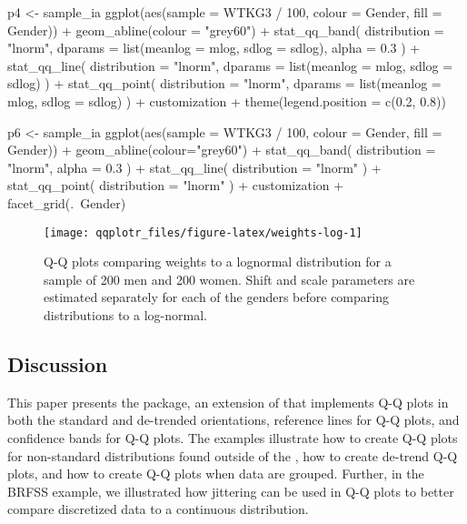 \begin{Schunk}
\begin{Sinput}
p4 <- sample_ia %>% 
  ggplot(aes(sample = WTKG3 / 100, colour = Gender, fill = Gender)) +
  geom_abline(colour = "grey60") +
  stat_qq_band(
    distribution = "lnorm",
    dparams = list(meanlog = mlog, sdlog = sdlog),
    alpha = 0.3
  ) +
  stat_qq_line(
    distribution = "lnorm",
    dparams = list(meanlog = mlog, sdlog = sdlog)
  ) +
  stat_qq_point(
    distribution = "lnorm",
    dparams = list(meanlog = mlog, sdlog = sdlog)
  ) +
  customization +
  theme(legend.position = c(0.2, 0.8)) 

p6 <- sample_ia %>% 
  ggplot(aes(sample = WTKG3 / 100, colour = Gender, fill = Gender)) +
  geom_abline(colour="grey60") +
  stat_qq_band(
    distribution = "lnorm", 
    alpha = 0.3
  ) +
  stat_qq_line(
    distribution = "lnorm"
  ) +
  stat_qq_point(
    distribution = "lnorm"
  ) +
  customization + facet_grid(.~Gender)
\end{Sinput}
\begin{figure}

{\centering \texttt{[image: qqplotr\_files/figure-latex/weights-log-1]} 

}

\caption[Q-Q plots comparing weights to a lognormal distribution for a sample of 200 men and 200 women]{Q-Q plots comparing weights to a lognormal distribution for a sample of 200 men and 200 women. Shift and scale parameters are estimated separately for each of the genders before comparing distributions to a log-normal.}\label{fig:weights-log}
\end{figure}
\end{Schunk}

\subsection{Discussion}\label{discussion}

This paper presents the  package, an extension of
 that implements Q-Q plots in both the standard and
de-trended orientations, reference lines for Q-Q plots, and confidence
bands for Q-Q plots. The examples illustrate how to create Q-Q plots for
non-standard distributions found outside of the , how to
create de-trend Q-Q plots, and how to create Q-Q plots when data are
grouped. Further, in the BRFSS example, we illustrated how jittering can
be used in Q-Q plots to better compare discretized data to a continuous
distribution.

